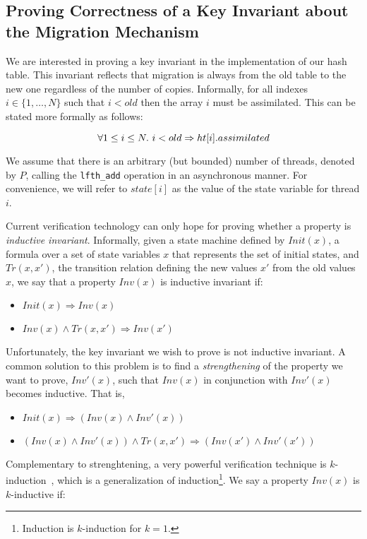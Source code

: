 \subsection{Proving Correctness of a Key Invariant about the Migration Mechanism}

We are interested in proving a key invariant in the implementation of
our hash table. This invariant reflects that migration is always from
the old table to the new one regardless of the number of
copies. Informally, for all indexes $i \in \{1, \ldots, N\}$ such that
$i < old$ then the array $i$ must be assimilated. This can be stated
more formally as follows:

  \[ \forall 1 \leq i \leq N.~ i < old \Rightarrow \mbox{$ht[i]$}.assimilated \]

We assume that there is an arbitrary (but bounded) number of threads,
denoted by $P$, calling the \texttt{lfth\_add} operation in an
asynchronous manner. For convenience, we will refer to $state[i]$ as
the value of the state variable for thread $i$.


Current verification technology can only hope for proving whether a
property is \emph{inductive invariant}. Informally, given a state
machine defined by $Init(x)$, a formula over a set of state variables
$x$ that represents the set of initial states, and $Tr(x,x')$, the
transition relation defining the new values $x'$ from the old values
$x$, we say that a property $Inv(x)$ is inductive invariant if:

\begin{itemize}
\item $Init(x) \Rightarrow Inv(x)$
\item $Inv(x) \wedge Tr(x,x') \Rightarrow Inv(x')$
\end{itemize}

Unfortunately, the key invariant we wish to prove is not inductive
invariant. A common solution to this problem is to find a
\emph{strengthening} of the property we want to prove, $Inv'(x)$, such
that $Inv(x)$ in conjunction with $Inv'(x)$ becomes inductive. That
is,

\begin{itemize}
\item $Init(x) \Rightarrow (Inv(x) \wedge Inv'(x))$
\item $(Inv(x) \wedge Inv'(x)) \wedge Tr(x,x') \Rightarrow (Inv(x') \wedge Inv'(x'))$
\end{itemize}

Complementary to strenghtening, a very powerful verification technique
is $k$-induction~\cite{MouraRS03}, which is a generalization of
induction\footnote{Induction is $k$-induction for $k=1$.}. We say a
property $Inv(x)$ is $k$-inductive if:

